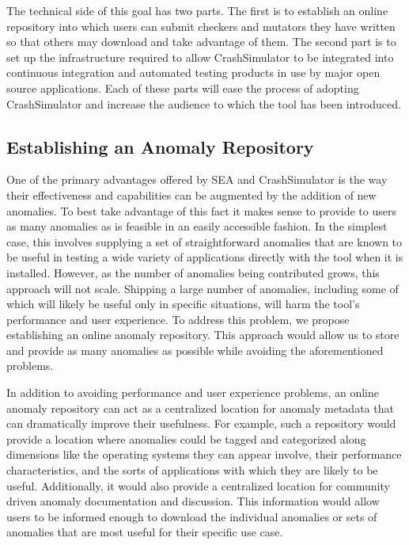 \documentclass[twocolumn]{article}
\begin{document}
The technical side of this goal has two parts.  The first is to establish
an online repository into which users can submit checkers and mutators they
have written so that others may download and take advantage of them.  The
second part is to set up the infrastructure required to allow
CrashSimulator to be integrated into continuous integration and automated
testing products in use by major open source applications.  Each of these
parts will ease the process of adopting CrashSimulator and increase the
audience to which the tool has been introduced.

\subsection{Establishing an Anomaly Repository}

One of the primary advantages offered by SEA and CrashSimulator is the way
their effectiveness and capabilities can be augmented by the addition of
new anomalies.  To best take advantage of this fact it makes sense to
provide to users as many anomalies as is feasible in an easily accessible
fashion.  In the simplest case, this involves supplying a set of
straightforward anomalies that are known to be useful in testing a wide
variety of applications directly with the tool when it is installed.
However, as the number of anomalies being contributed grows, this approach
will not scale.  Shipping a large number of anomalies, including some of
which will likely be useful only in specific situations, will harm the
tool's performance and user experience.  To address this problem, we
propose establishing an online anomaly repository.  This approach would
allow us to  store and provide as many anomalies as possible while avoiding
the aforementioned problems.

In addition to avoiding performance and user experience problems, an online
anomaly repository can act as a centralized location for anomaly metadata
that can dramatically improve their usefulness. For example, such a
repository would provide a location where anomalies could be tagged and
categorized along dimensions like the operating systems they can appear
involve, their performance characteristics, and the sorts of applications
with which they are likely to be useful.  Additionally, it would also
provide a centralized location for community driven anomaly documentation
and discussion.  This information would allow users to be informed enough
to download the individual anomalies or sets of anomalies that are most
useful for their specific use case.
\end{document}
